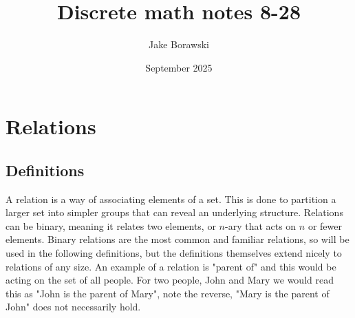 \documentclass{article}
\title{Discrete math notes 8-28}
\author{Jake Borawski}
\date{September 2025}
\begin{document}
\maketitle

\section{Relations}

\subsection{Definitions}
A relation is a way of associating elements of a set. This is done to partition a larger set into simpler groups that can reveal an underlying structure. Relations can be binary, meaning it relates two elements, or $n$-ary that acts on $n$ or fewer elements. Binary relations are the most common and familiar relations, so will be used in the following definitions, but the definitions themselves extend nicely to relations of any size. An example of a relation is "parent of" and this would be acting on the set of all people. For two people, John and Mary we would read this as "John is the parent of Mary", note the reverse, "Mary is the parent of John" does not necessarily hold.
\end{document}
